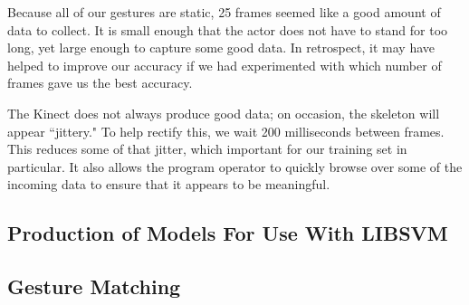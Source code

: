 \documentclass[11pt,conference]{IEEEtran}
\begin{document}
Because all of our gestures are static, 25 frames seemed like a good amount of data to collect. It is small enough that the actor does not have to stand for too long, yet large enough to capture some good data. In retrospect, it may have helped to improve our accuracy if we had experimented with which number of frames gave us the best accuracy.

The Kinect does not always produce good data; on occasion, the skeleton will appear ``jittery." To help rectify this, we wait 200 milliseconds between frames. This reduces some of that jitter, which important for our training set in particular. It also allows the program operator to quickly browse over some of the incoming data to ensure that it appears to be meaningful.

\subsection{Production of Models For Use With LIBSVM}

\subsection{Gesture Matching}
\end{document}
